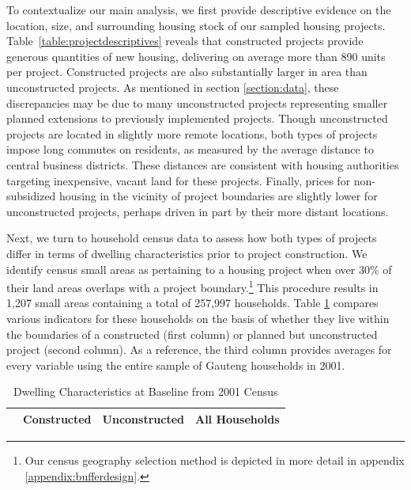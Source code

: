 \documentclass[12pt]{article}
\begin{document}
To contextualize our main analysis, we first provide descriptive evidence on the location, size, and surrounding housing stock of our  sampled housing projects. Table~\ref{table:projectdescriptives} reveals that constructed projects provide generous quantities of new housing, delivering on average more than 890 units per project. Constructed projects are also substantially larger in area than unconstructed projects. As mentioned in section \ref{section:data}, these discrepancies may be due to many unconstructed projects representing smaller planned extensions to previously implemented projects. Though unconstructed projects are located in slightly more remote locations, both types of projects impose long commutes on residents, as measured by the average distance to central business districts. These distances are consistent with housing authorities targeting inexpensive, vacant land for these projects. Finally, prices for non-subsidized housing in the vicinity of project boundaries are slightly lower for unconstructed projects, perhaps driven in part by their more distant locations.


Next, we turn to household census data to assess how both types of projects differ in terms of dwelling characteristics prior to project construction. We identify census small areas as pertaining to a housing project when over 30\% of their land areas overlaps with a project boundary.\footnote{Our census geography selection method is depicted in more detail in appendix \ref{appendix:bufferdesign}.} This procedure results in 1,207 small areas containing a total of 257,997 households. Table \ref{table:projectdescriptivescensus} compares various indicators for these households on the basis of whether they live within the boundaries of a constructed (first column) or planned but unconstructed project (second column). As a reference, the third column provides averages for every variable using the entire sample of Gauteng households in 2001. 
 

\begin{table}[h!]
	\centering
	\caption{Dwelling Characteristics at Baseline from 2001 Census}\label{table:projectdescriptivescensus}
\vspace{-2mm}
\begin{tabular}{l*{1}{ccc}}
\toprule
& Constructed & Unconstructed & All Households \\
\midrule
 
\bottomrule
\end{tabular}
\end{table}
\end{document}
